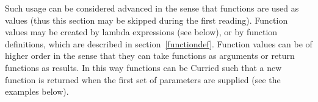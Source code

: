 \documentclass{overturerepchap}
\newcommand{\keyw}[1]{{\bf\ttfamily #1}}
\begin{document}
Such usage can be considered advanced in the sense
that functions are used as values (thus this section
may be skipped during the first reading). Function values may be created by
lambda expressions (see below), or by function definitions, which are
described in section~\ref{functiondef}.  Function values can be of
higher order in the sense that they can take functions as arguments or
return functions as results. In this way functions can be Curried such
that a new function is returned when the first set of parameters are
supplied (see the examples below).

\end{document}
